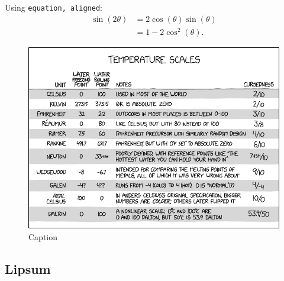 \documentclass[11pt, a4paper, twocolumn]{article}
\begin{document}
Using \texttt{equation, aligned}:
\begin{equation} %
\begin{aligned} %
    \sin(2\theta) & = 2\cos(\theta)\sin(\theta) \\
    & = 1-2\cos^2(\theta).
\end{aligned}
\end{equation}

\begin{figure}
    \centering
    \includegraphics[width=\linewidth]{figures/temperature_scales.png}
    \caption{Caption}
    \label{fig:temp-scales}
\end{figure}

\subsection{Lipsum}

\lipsum
\end{document}
